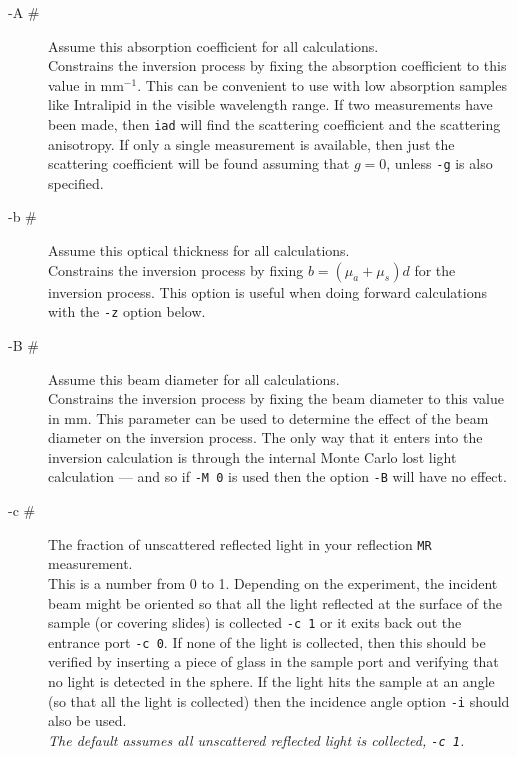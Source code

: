 \documentclass{article}
\begin{document}
\begin{description}
    \item[-A \#] Assume this absorption coefficient for all calculations.\\[1mm]
                 Constrains the inversion process by fixing the absorption coefficient to this value in mm$^{-1}$.  
                 This can be convenient to use with low absorption samples like Intralipid in the visible wavelength
                 range. If two measurements have been made, then \texttt{iad} will find the scattering coefficient and
                 the scattering anisotropy.  If only a single measurement is available, then just the scattering coefficient
                 will be found assuming that $g=0$, unless \texttt{-g} is also specified.
                 
    \item[-b \#] Assume this optical thickness for all calculations.\\[1mm]
                 Constrains the inversion process by fixing $b=(\mu_a+\mu_s)d$ for the inversion process. This option
                 is useful when doing forward calculations with the \texttt{-z} option below.
                     
    \item[-B \#] Assume this beam diameter for all calculations.\\[1mm]
                 Constrains the inversion process by fixing the beam diameter to this value in mm.  This parameter
                 can be used to determine the effect of the beam diameter on the inversion process.  The only way
                 that it enters into the inversion calculation is through the internal Monte Carlo lost light
                 calculation --- and so if \texttt{-M 0} is used then the option \texttt{-B} will have
                 no effect.
                 
    \item[-c \#] The fraction of unscattered reflected light in your reflection \texttt{MR} measurement.\\[1mm]
                 This is a number from 0 to 1. Depending on the experiment, the incident beam might be oriented so that all the light
                 reflected at the surface of the sample (or covering slides) is collected \texttt{-c 1} or it exits
                 back out the entrance port \texttt{-c 0}.  If none of the light is collected, then this should be
                 verified by inserting a piece of glass in the sample port and verifying that no light is detected
                 in the sphere. If the light hits the sample at an angle (so that all the light is collected) then the 
                 incidence angle option \texttt{-i} should also be used.\\[1mm]
                 \textit{The default assumes all unscattered reflected light is collected, \texttt{-c 1}.}
                 

\end{description}
\end{document}
